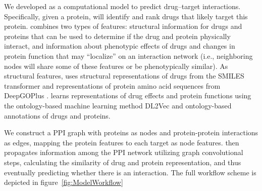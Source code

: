\documentclass{bioinfo}
\renewcommand{\cite}{\citep}
\begin{document}

We developed \name as a computational model to predict drug--target
interactions. Specifically, given a protein, \name will identify and
rank drugs that likely target this protein. \name combines two types
of features: structural information for drugs and proteins that can be
used to determine if the drug and protein physically interact, and
information about phenotypic effects of drugs and changes in protein
function that may ``localize'' on an interaction network (i.e.,
neighboring nodes will share some of these features or be
phenotypically similar).  As structural features, \name uses
structural representations of drugs from the SMILES transformer
\cite{SmilesTransformer} and representations of protein amino acid
sequences from DeepGOPlus \cite{DeepGoPlus}.  \name learns
representations of drug effects and protein functions using the
ontology-based machine learning method DL2Vec \cite{DL2vec2020} and
ontology-based annotations of drugs and proteins.

We construct a PPI graph with proteins as nodes and protein-protein interactions as edges, mapping the protein features to each target as node features. \name then propagates information among the PPI network utilizing graph convolutional steps, calculating the similarity of drug and protein representation, and thus eventually predicting whether there is an interaction. The full workflow scheme is depicted in figure~\ref{fig:ModelWorkflow}

\end{document}
